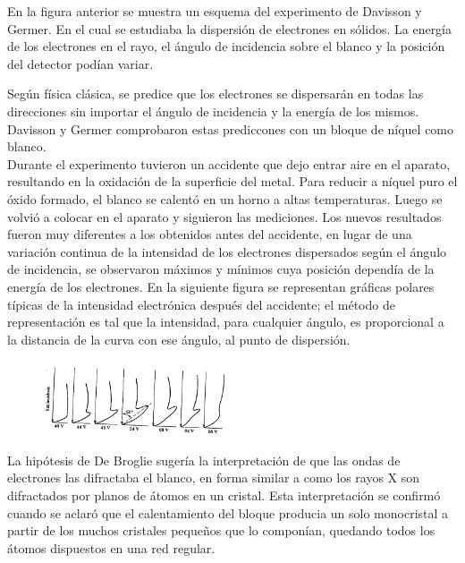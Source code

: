 \documentclass[a4paper]{article}
\begin{document}
    \indent En la figura anterior se muestra un esquema del experimento de Davisson y Germer. En el cual se estudiaba la dispersión de electrones en sólidos. La energía de los electrones en el rayo, el ángulo de incidencia sobre el blanco y la posición del detector podían variar. \\

    \newpage
    \noindent
    \thispagestyle{fancy}

    \indent Según física clásica, se predice que los electrones se dispersarán en todas las direcciones sin importar el ángulo de incidencia y la energía de los mismos. Davisson y Germer comprobaron estas prediccones con un bloque de níquel como blanco.\\

    \indent Durante el experimento tuvieron un accidente que dejo entrar aire en el aparato, resultando en la oxidación de la superficie del metal. Para reducir a níquel puro el óxido formado, el blanco se calentó en un horno a altas temperaturas. Luego se volvió a colocar en el aparato y siguieron las mediciones. Los nuevos resultados fueron muy diferentes a los obtenidos antes del accidente, en lugar de una variación continua de la intensidad de los electrones dispersados según el ángulo de incidencia, se observaron máximos y mínimos cuya posición dependía de la energía de los electrones. En la siguiente figura se representan gráficas polares típicas de la intensidad electrónica después del accidente; el método de representación es tal que la intensidad, para cualquier ángulo, es proporcional a la distancia de la curva con ese ángulo, al punto de dispersión.

    \begin{figure}[h!]
        \centering
        \includegraphics[width = 5.5cm]{../grafica.png}
    \end{figure}

    \indent La hipótesis de De Broglie sugería la interpretación de que las ondas de electrones las difractaba el blanco, en forma similar a como los rayos X son difractados por planos de átomos en un cristal. Esta interpretación se confirmó cuando se aclaró que el calentamiento del bloque producia un solo monocristal a partir de los muchos cristales pequeños que lo componían, quedando todos los átomos dispuestos en una red regular.
\end{document}
